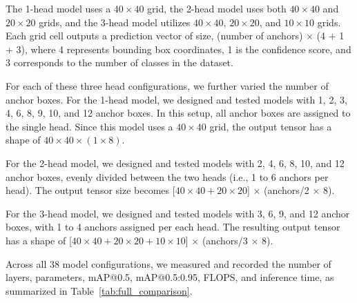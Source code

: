 \documentclass[journal,twoside,web]{ieeecolor}
\begin{document}
The 1-head model uses a $40 \times 40$ grid, the 2-head model uses both $40 \times 40$ and $20 \times 20$ grids, and the 3-head model utilizes $40 \times 40$, $20 \times 20$, and $10 \times 10$ grids. Each grid cell outputs a prediction vector of size, (number of anchors) $\times$ (4 + 1 + 3), where 4 represents bounding box coordinates, 1 is the confidence score, and 3 corresponds to the number of classes in the dataset.

For each of these three head configurations, we further varied the number of anchor boxes. For the 1-head model, we designed and tested models with 1, 2, 3, 4, 6, 8, 9, 10, and 12 anchor boxes. In this setup, all anchor boxes are assigned to the single head. Since this model uses a $40 \times 40$ grid, the output tensor has a shape of $40 \times 40 \times (1 \times 8)$.

For the 2-head model, we designed and tested models with 2, 4, 6, 8, 10, and 12 anchor boxes, evenly divided between the two heads (i.e., 1 to 6 anchors per head). The output tensor size becomes [$40 \times 40 + 20 \times 20$] $\times$ (anchors/2 $\times$ 8).

For the 3-head model, we designed and tested models with 3, 6, 9, and 12 anchor boxes, with 1 to 4 anchors assigned per each head. The resulting output tensor has a shape of [$40 \times 40 + 20 \times 20 + 10 \times 10$] $\times$ (anchors/3 $\times$ 8).

Across all 38 model configurations, we measured and recorded the number of layers, parameters, mAP@0.5, mAP@0.5:0.95, \ac{FLOPS}, and inference time, as summarized in Table~\ref{tab:full_comparison}.
\end{document}
